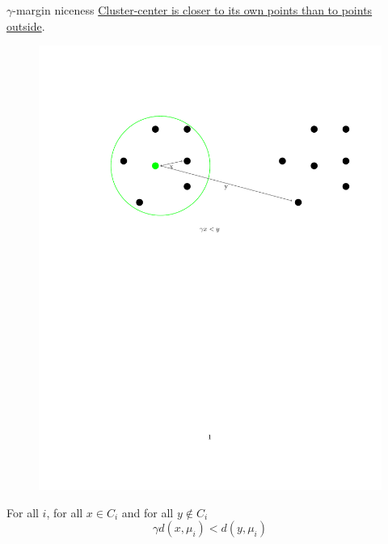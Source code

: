 \documentclass{beamer}
\begin{document}
\begin{frame}[label=gammaMargin]{$\gamma$-margin niceness}
	\hyperlink{resultsGammaMargin}{Cluster-center is closer to its own points than to points outside}.
	\vspace{1cm}\begin{figure}        
            \centering\includegraphics[trim= 400 470 400 150, scale=0.5]{figures/gammaMargin.pdf}
    \end{figure} 
    \begin{block}{}
		For all $i$, for all $x \in C_i$ and for all $y \not\in C_i$
		$$\gamma d(x, \mu_i) < d(y, \mu_i)$$	
	\end{block}  
\end{frame}
\end{document}
